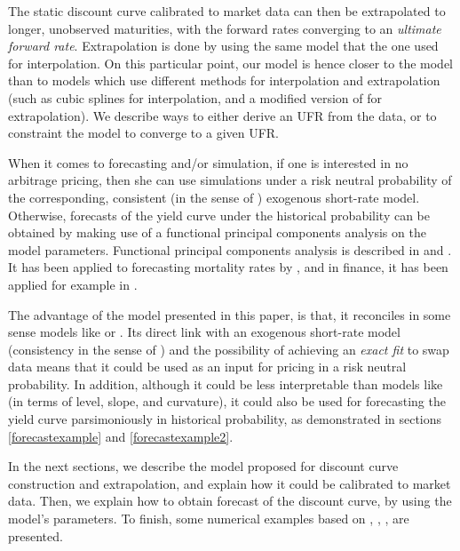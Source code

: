 The static discount curve calibrated to market data can then be extrapolated to longer, unobserved maturities, with the forward rates converging to an \textit{ultimate forward rate}. Extrapolation is done by using the same model that the one used for interpolation. On this particular point, our model is hence closer to the \cite{smithwilson2001} model than to models which use different methods for interpolation and extrapolation (such as cubic splines for interpolation, and a modified version of \cite{nelson1987parsimonious} for extrapolation). We describe ways to either derive an UFR from the data, or to constraint the model to converge to a given UFR.


\medskip

When it comes to forecasting and/or simulation, if one is interested in no arbitrage pricing, then she can use simulations under a risk neutral probability of the corresponding, consistent (in the sense of \cite{bjork1999interest}) exogenous short-rate model. Otherwise, forecasts of the yield curve under the historical probability can be obtained by making use of a functional principal components analysis on the model parameters. Functional principal components analysis is described in \cite{ramsay1991some} and \cite{ramsay2005springer}. It has been applied to forecasting mortality rates by \cite{hyndman2007robust}, and in finance, it has been applied for example in \cite{Benko2007Functional}. 

\medskip

The advantage of the model presented in this paper, is that, it reconciles in some sense models like \cite{diebold2006forecasting} or \cite{smithwilson2001}. Its direct link with an exogenous short-rate model (consistency in the sense of \cite{bjork1999interest}) and the possibility of achieving an \textit{exact fit} to swap data means that it could be used as an input for pricing in a risk neutral probability. In addition, although it could be less interpretable than models like \cite{diebold2006forecasting} (in terms of level, slope, and curvature), it could also be used for forecasting the yield curve parsimoniously in historical probability, as demonstrated in sections \ref{forecastexample} and \ref{forecastexample2}.  

\medskip

In the next sections, we describe the model proposed for discount curve construction and extrapolation, and explain how it could be calibrated to market data. Then, we explain how to obtain forecast of the discount curve, by using the model's parameters. To finish, some numerical examples based on \cite{hagan2006interpolation}, \cite{andersen2007discount}, \cite{andersen2010interest}, \cite{ametrano2013everything} are presented.

